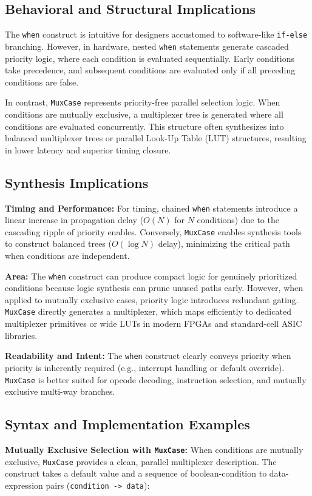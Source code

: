 \subsection{Behavioral and Structural Implications}
The \texttt{when} construct is intuitive for designers accustomed to software-like \texttt{if-else} branching. However, in hardware, nested \texttt{when} statements generate cascaded priority logic, where each condition is evaluated sequentially. Early conditions take precedence, and subsequent conditions are evaluated only if all preceding conditions are false.

In contrast, \texttt{MuxCase} represents priority-free parallel selection logic. When conditions are mutually exclusive, a multiplexer tree is generated where all conditions are evaluated concurrently. This structure often synthesizes into balanced multiplexer trees or parallel Look-Up Table (LUT) structures, resulting in lower latency and superior timing closure.

\subsection{Synthesis Implications}
\textbf{Timing and Performance:}  
For timing, chained \texttt{when} statements introduce a linear increase in propagation delay ($O(N)$ for $N$ conditions) due to the cascading ripple of priority enables. Conversely, \texttt{MuxCase} enables synthesis tools to construct balanced trees ($O(\log N)$ delay), minimizing the critical path when conditions are independent.

\textbf{Area:}  
The \texttt{when} construct can produce compact logic for genuinely prioritized conditions because logic synthesis can prune unused paths early. However, when applied to mutually exclusive cases, priority logic introduces redundant gating. \texttt{MuxCase} directly generates a multiplexer, which maps efficiently to dedicated multiplexer primitives or wide LUTs in modern FPGAs and standard-cell ASIC libraries.

\textbf{Readability and Intent:}  
The \texttt{when} construct clearly conveys priority when priority is inherently required (e.g., interrupt handling or default override). \texttt{MuxCase} is better suited for opcode decoding, instruction selection, and mutually exclusive multi-way branches.

\subsection{Syntax and Implementation Examples}
\textbf{Mutually Exclusive Selection with \texttt{MuxCase}:}  
When conditions are mutually exclusive, \texttt{MuxCase} provides a clean, parallel multiplexer description. The construct takes a default value and a sequence of boolean-condition to data-expression pairs (\texttt{condition -> data}):


